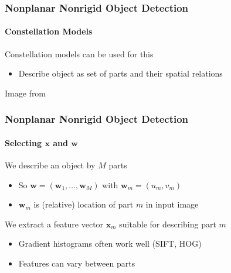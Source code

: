 \documentclass[xetex,professionalfont]{beamer}
\renewcommand{\vec}[1]{\ensuremath{\mathbf{#1}}}
\newcommand{\vw}{\vec{w}}
\newcommand{\vx}{\vec{x}}
\renewcommand\emph[1]{\textcolor{tuwcvl_inf_red}{#1}}
\begin{document}

\begin{frame}
\frametitle{Nonplanar Nonrigid Object Detection}
\framesubtitle{Constellation Models}

\emph{Constellation models} can be used for this
\begin{itemize}
    \item Describe object as set of parts and their spatial relations
\end{itemize}

\medskip
\begin{center}
    {\centering Image from \cite{fischler1973}}
\end{center}

\end{frame}


\begin{frame}
\frametitle{Nonplanar Nonrigid Object Detection}
\framesubtitle{Selecting $\vx$ and $\vw$}

We describe an object by $M$ parts
\begin{itemize}
    \item So $\vw=(\vw_1,\dots,\vw_M)$ with $\vw_m=(u_m,v_m)$
    \item $\vw_m$ is (relative) location of part $m$ in input image %
\end{itemize}

\bigskip
We extract a feature vector $\vx_m$ suitable for describing part $m$
\begin{itemize}
    \item Gradient histograms often work well (SIFT, HOG)
    \item Features can vary between parts
\end{itemize}

\end{frame}
\end{document}
